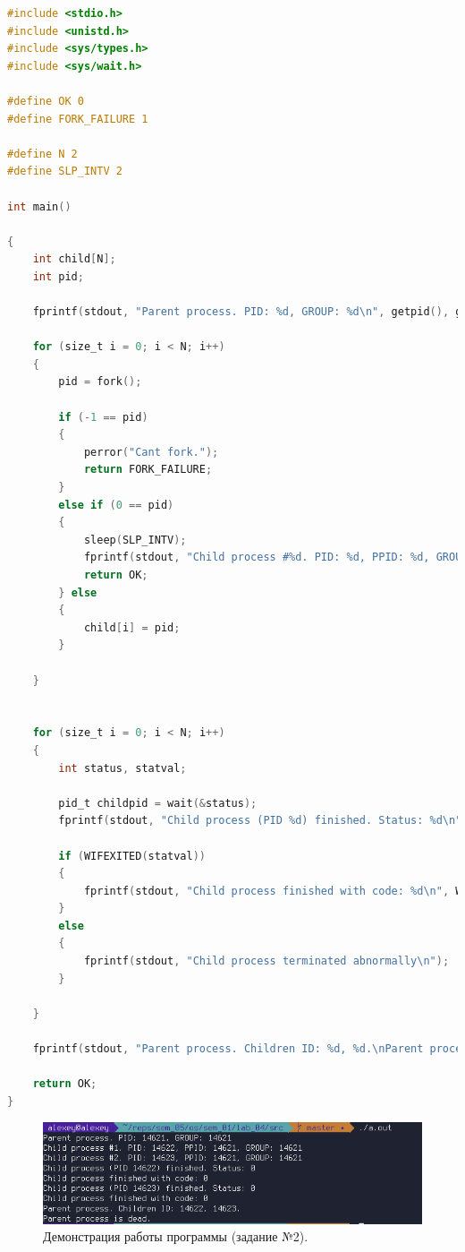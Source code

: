 \documentclass[12pt]{report}
\begin{document}
\begin{lstlisting}[label=some-code,caption=Вызов функции wait(),language=C]
#include <stdio.h>
#include <unistd.h>
#include <sys/types.h>
#include <sys/wait.h>

#define OK 0
#define FORK_FAILURE 1

#define N 2
#define SLP_INTV 2

int main()

{
	int child[N];
	int pid;
	
	fprintf(stdout, "Parent process. PID: %d, GROUP: %d\n", getpid(), getpgrp());
	
	for (size_t i = 0; i < N; i++)
	{
		pid = fork();
		
		if (-1 == pid)
		{
			perror("Cant fork.");
			return FORK_FAILURE;
		}
		else if (0 == pid)
		{
			sleep(SLP_INTV);
			fprintf(stdout, "Child process #%d. PID: %d, PPID: %d, GROUP: %d\n", i + 1, getpid(), getppid(), getpgrp());
			return OK;
		} else
		{
			child[i] = pid;
		}

	}

	
	for (size_t i = 0; i < N; i++)
	{
		int status, statval;
		
		pid_t childpid = wait(&status);
		fprintf(stdout, "Child process (PID %d) finished. Status: %d\n", childpid, status);
		
		if (WIFEXITED(statval))
		{
			fprintf(stdout, "Child process finished with code: %d\n", WEXITSTATUS(statval));
		}
		else
		{
			fprintf(stdout, "Child process terminated abnormally\n");
		}
		
	}
	
	fprintf(stdout, "Parent process. Children ID: %d, %d.\nParent process is dead.\n", child[0], child[1]);
	
	return OK;
}
\end{lstlisting}

\begin{figure}[H]

	\centering

	\includegraphics[width=\linewidth]{img/task02.png}
	\caption{Демонстрация работы программы (задание №2).}

	\label{fig:task02}

\end{figure}
\end{document}
